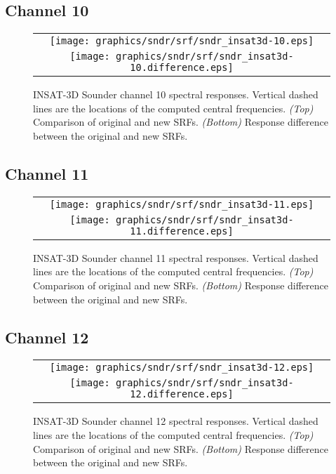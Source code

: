 \subsection{Channel 10}
\begin{figure}[H]
  \label{fig:sndr_ch10}
  \centering
  \begin{tabular}{c}
    \texttt{[image: graphics/sndr/srf/sndr\_insat3d-10.eps]} \\
    \texttt{[image: graphics/sndr/srf/sndr\_insat3d-10.difference.eps]}
  \end{tabular}
  \caption{INSAT-3D Sounder channel 10 spectral responses. Vertical dashed lines are the locations of the computed central frequencies. \emph{(Top)} Comparison of original and new SRFs. \emph{(Bottom)} Response difference between the original and new SRFs.}
\end{figure}

\subsection{Channel 11}
\begin{figure}[H]
  \label{fig:sndr_ch11}
  \centering
  \begin{tabular}{c}
    \texttt{[image: graphics/sndr/srf/sndr\_insat3d-11.eps]} \\
    \texttt{[image: graphics/sndr/srf/sndr\_insat3d-11.difference.eps]}
  \end{tabular}
  \caption{INSAT-3D Sounder channel 11 spectral responses. Vertical dashed lines are the locations of the computed central frequencies. \emph{(Top)} Comparison of original and new SRFs. \emph{(Bottom)} Response difference between the original and new SRFs.}
\end{figure}

\subsection{Channel 12}
\begin{figure}[H]
  \label{fig:sndr_ch12}
  \centering
  \begin{tabular}{c}
    \texttt{[image: graphics/sndr/srf/sndr\_insat3d-12.eps]} \\
    \texttt{[image: graphics/sndr/srf/sndr\_insat3d-12.difference.eps]}
  \end{tabular}
  \caption{INSAT-3D Sounder channel 12 spectral responses. Vertical dashed lines are the locations of the computed central frequencies. \emph{(Top)} Comparison of original and new SRFs. \emph{(Bottom)} Response difference between the original and new SRFs.}
\end{figure}

